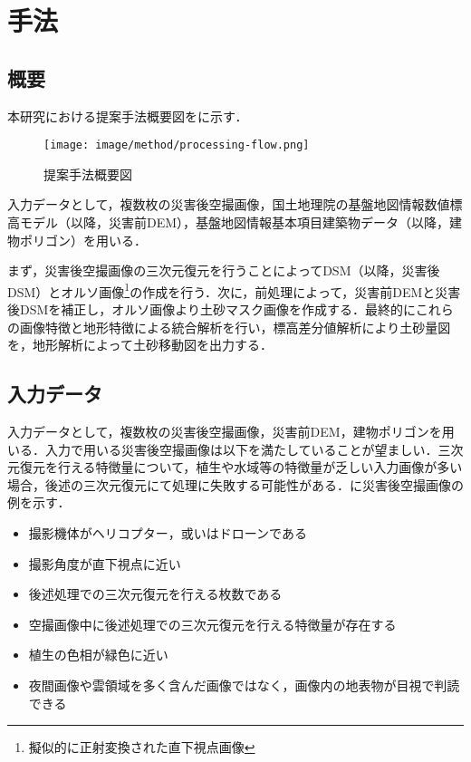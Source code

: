 \chapter{手法}
  \section{概要}
    本研究における提案手法概要図をに示す．

    \begin{figure}[t]
      \centering
      \texttt{[image: image/method/processing-flow.png]}
      \caption{提案手法概要図}
      \label{提案手法概要図}
    \end{figure}
    
    入力データとして，複数枚の災害後空撮画像，国土地理院の基盤地図情報数値標高モデル（以降，災害前DEM），基盤地図情報基本項目建築物データ\cite{基盤地図情報}（以降，建物ポリゴン）を用いる．

    まず，災害後空撮画像の三次元復元を行うことによってDSM（以降，災害後DSM）とオルソ画像\footnote{擬似的に正射変換された直下視点画像}の作成を行う．次に，前処理によって，災害前DEMと災害後DSMを補正し，オルソ画像より土砂マスク画像を作成する．最終的にこれらの画像特徴と地形特徴による統合解析を行い，標高差分値解析により土砂量図を，地形解析によって土砂移動図を出力する．



  \section{入力データ}
    \label{入力データ}
    入力データとして，複数枚の災害後空撮画像，災害前DEM，建物ポリゴンを用いる．入力で用いる災害後空撮画像は以下を満たしていることが望ましい．三次元復元を行える特徴量について，植生や水域等の特徴量が乏しい入力画像が多い場合，後述の三次元復元にて処理に失敗する可能性がある．に災害後空撮画像の例を示す．

    \begin{itemize}
      \setlength{\itemsep}{-5pt}
      \item 撮影機体がヘリコプター，或いはドローンである
      \item 撮影角度が直下視点に近い
      \item 後述処理での三次元復元を行える枚数である
      \item 空撮画像中に後述処理での三次元復元を行える特徴量が存在する
      \item 植生の色相が緑色に近い
      \item 夜間画像や雲領域を多く含んだ画像ではなく，画像内の地表物が目視で判読できる
    \end{itemize}

